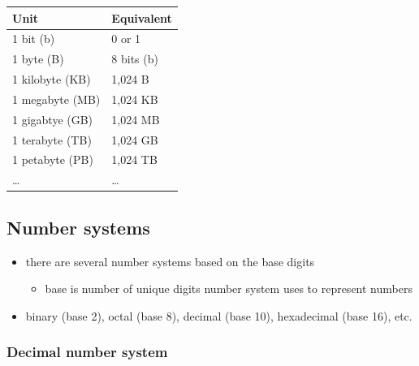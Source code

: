 \documentclass[11pt]{article}
\providecommand{\tightlist}{%
      \setlength{\itemsep}{0pt}\setlength{\parskip}{0pt}}
\begin{document}
\begin{longtable}[]{@{}ll@{}}
\toprule
Unit & Equivalent \\
\midrule
\endhead
1 bit (b) & 0 or 1 \\
1 byte (B) & 8 bits (b) \\
1 kilobyte (KB) & 1,024 B \\
1 megabyte (MB) & 1,024 KB \\
1 gigabtye (GB) & 1,024 MB \\
1 terabyte (TB) & 1,024 GB \\
1 petabyte (PB) & 1,024 TB \\
\ldots{} & \ldots{} \\
\bottomrule
\end{longtable}

    \hypertarget{number-systems}{%
\subsection{Number systems}\label{number-systems}}

\begin{itemize}
\tightlist
\item
  there are several number systems based on the base digits

  \begin{itemize}
  \tightlist
  \item
    base is number of unique digits number system uses to represent
    numbers
  \end{itemize}
\item
  binary (base 2), octal (base 8), decimal (base 10), hexadecimal (base
  16), etc.
\end{itemize}

\hypertarget{decimal-number-system}{%
\subsubsection{Decimal number system}\label{decimal-number-system}}
\end{document}
